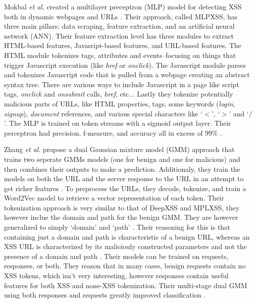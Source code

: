 Mokbal \textit{et al.} created a multilayer preceptron (MLP) model for detecting XSS both in dynamic webpages and URLs \cite{mokbal2019mlpxss}. Their approach, called MLPXSS, has three main pillars: data scraping, feature extraction, and an artificial neural network (ANN). Their feature extraction level has three modules to extract HTML-based features, Javasript-based features, and URL-based features. The HTML module tokenizes tags, attributes and events--focusing on things that trigger Javascript execution (like \textit{href} or \textit{onclick}). The Javascript module parses and tokenizes Javascript code that is pulled from a webpage creating an abstract syntax tree. There are various ways to include Javascript in a page like script tags, \textit{onclick} and \textit{onsubmit} calls, \textit{href}, etc... Lastly they tokenize potentially malicious parts of URLs, like HTML properties, tags, some keywords (\textit{login}, \textit{signup}), \textit{document} references, and various special characters like `$<$', `$>$' and `$/$'. The MLP is trained on token streams with a sigmoid output layer. Their perceptron had precision, f-measure, and accuracy all in excess of 99\% \cite{mokbal2019mlpxss}.

Zhang \textit{et al.} propose a dual Gaussian mixture model (GMM) approach that trains two seperate GMMs models (one for benign and one for malicious) and then combines their outputs to make a prediction. Additionaly, they train the models on both the URL and the server response to the URL in an attempt to get richer features \cite{zhang2019cross}. To preprocess the URLs, they decode, tokenize, and train a Word2Vec model to retrieve a vector representation of each token. Their tokenization approach is very similar to that of DeepXSS and MPLXSS, they however inclue the domain and path for the benign GMM. They are however generalized to simply `domain' and `path' \cite{zhang2019cross}. Their reasoning for this is that containing just a domain and path is characteristic of a benign URL, whereas an XSS URL is characterized by its maliciouly constructed parameters and not the presence of a domain and path \cite{zhang2019cross}. Their models can be trained on requests, responses, or both. They reason that in many cases, benign requests contain no XSS tokens, which isn't very interesting, however responses contain useful features for both XSS and none-XSS tokenization. Their multi-stage dual GMM using both responses and requests greatly improved classification \cite{zhang2019cross}.

